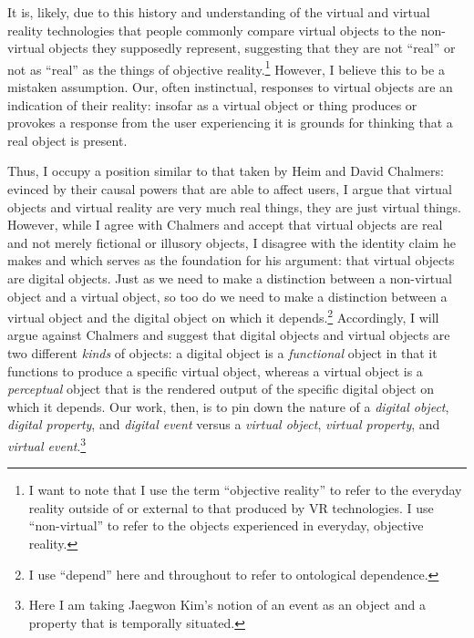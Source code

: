 \documentclass{article}
\begin{document}
It is, likely, due to this history and understanding of the virtual and virtual reality technologies that people commonly compare virtual objects to the non-virtual objects they supposedly represent, suggesting that they are not “real” or not as “real” as the things of objective reality.\footnote{I want to note that I use the term “objective reality” to refer to the everyday reality outside of or external to that produced by VR technologies. I use “non-virtual” to refer to the objects experienced in everyday, objective reality.} However, I believe this to be a mistaken assumption. Our, often instinctual, responses to virtual objects are an indication of their reality: insofar as a virtual object or thing produces or provokes a response from the user experiencing it is grounds for thinking that a real object is present.

Thus, I occupy a position similar to that taken by Heim and David Chalmers: evinced by their causal powers that are able to affect users, I argue that virtual objects and virtual reality are very much real things, they are just virtual things. However, while I agree with Chalmers and accept that virtual objects are real and not merely fictional or illusory objects, I disagree with the identity claim he makes and which serves as the foundation for his argument: that virtual objects are digital objects. Just as we need to make a distinction between a non-virtual object and a virtual object, so too do we need to make a distinction between a virtual object and the digital object on which it depends.\footnote{I use “depend” here and throughout to refer to ontological dependence.} Accordingly, I will argue against Chalmers and suggest that digital objects and virtual objects are two different \textit{kinds} of objects: a digital object is a \textit{functional} object in that it functions to produce a specific virtual object, whereas a virtual object is a \textit{perceptual} object that is the rendered output of the specific digital object on which it depends. Our work, then, is to pin down the nature of a \textit{digital object}, \textit{digital property}, and \textit{digital event} versus a \textit{virtual object}, \textit{virtual property}, and \textit{virtual event}.\footnote{Here I am taking Jaegwon Kim’s notion of an event as an object and a property that is temporally situated.}
\end{document}
